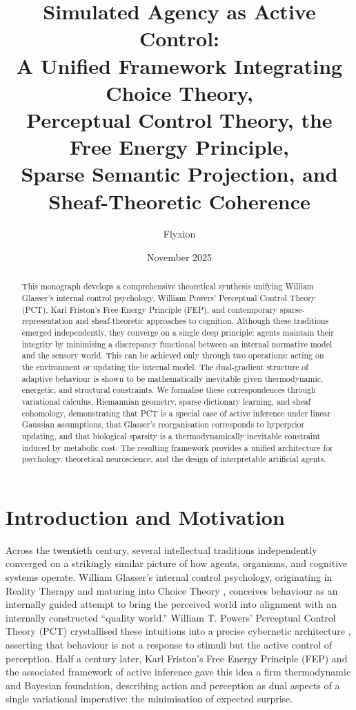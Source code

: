 \documentclass[11pt,a4paper,twoside]{article}
\title{Simulated Agency as Active Control:\\
A Unified Framework Integrating Choice Theory,\\
Perceptual Control Theory, the Free Energy Principle,\\
Sparse Semantic Projection, and Sheaf-Theoretic Coherence}
\author{Flyxion}
\date{November 2025}
\begin{document}
\maketitle

\begin{abstract}
This monograph develops a comprehensive theoretical synthesis unifying
William Glasser’s internal control psychology, William Powers’ Perceptual Control Theory (PCT),
Karl Friston’s Free Energy Principle (FEP), and contemporary sparse-representation
and sheaf-theoretic approaches to cognition.
Although these traditions emerged independently, they converge on a single deep principle:
agents maintain their integrity by minimising a discrepancy functional between an internal normative
model and the sensory world.
This can be achieved only through two operations:
acting on the environment or updating the internal model.
The dual-gradient structure of adaptive behaviour is shown
to be mathematically inevitable given thermodynamic, energetic, and structural constraints.
We formalise these correspondences through variational calculus,
Riemannian geometry, sparse dictionary learning,
and sheaf cohomology, demonstrating that PCT is a special case of active inference
under linear–Gaussian assumptions, that Glasser’s reorganisation corresponds to hyperprior updating,
and that biological sparsity is a thermodynamically inevitable constraint induced by metabolic cost.
The resulting framework provides a unified architecture for
psychology, theoretical neuroscience, and the design of interpretable artificial agents.
\end{abstract}

\newpage

\tableofcontents
\newpage


\section{Introduction and Motivation}

Across the twentieth century, several intellectual traditions independently converged
on a strikingly similar picture of how agents, organisms, and cognitive systems operate.
William Glasser’s internal control psychology, originating in Reality Therapy
and maturing into Choice Theory \cite{glasser1998choice,glasser1981stations},
conceives behaviour as an internally guided attempt to bring the perceived world
into alignment with an internally constructed ``quality world.''
William T. Powers’ Perceptual Control Theory (PCT)
crystallised these intuitions into a precise cybernetic architecture
\cite{powers1973behavior,powers2005behavior},
asserting that behaviour is not a response to stimuli but the active control of perception.
Half a century later, Karl Friston's Free Energy Principle (FEP)
\cite{friston2009free,friston2010free}
and the associated framework of active inference gave this idea a firm
thermodynamic and Bayesian foundation, describing action and perception as dual aspects
of a single variational imperative: the minimisation of expected surprise.
\end{document}
